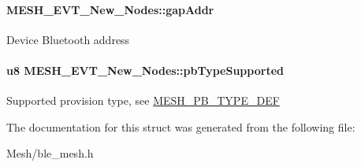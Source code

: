 \paragraph[{\texorpdfstring{gap\+Addr}{gapAddr}}]{ M\+E\+S\+H\+\_\+\+E\+V\+T\+\_\+\+New\+\_\+\+Nodes\+::gap\+Addr}\hypertarget{struct_m_e_s_h___e_v_t___new___nodes_a19485d7ad45684a0a41f49e32553a7b7}{}\label{struct_m_e_s_h___e_v_t___new___nodes_a19485d7ad45684a0a41f49e32553a7b7}
Device Bluetooth address 
\paragraph[{\texorpdfstring{pb\+Type\+Supported}{pbTypeSupported}}]{\setlength{\rightskip}{0pt plus 5cm}u8 M\+E\+S\+H\+\_\+\+E\+V\+T\+\_\+\+New\+\_\+\+Nodes\+::pb\+Type\+Supported}\hypertarget{struct_m_e_s_h___e_v_t___new___nodes_a21eb0ad5efff6987fbcda09cb4c192e7}{}\label{struct_m_e_s_h___e_v_t___new___nodes_a21eb0ad5efff6987fbcda09cb4c192e7}
Supported provision type, see \hyperlink{group___m_e_s_h___p_b___t_y_p_e___d_e_f}{M\+E\+S\+H\+\_\+\+P\+B\+\_\+\+T\+Y\+P\+E\+\_\+\+D\+EF} 

The documentation for this struct was generated from the following file\+:\begin{DoxyCompactItemize}
\item 
Mesh/ble\+\_\+mesh.\+h\end{DoxyCompactItemize}
